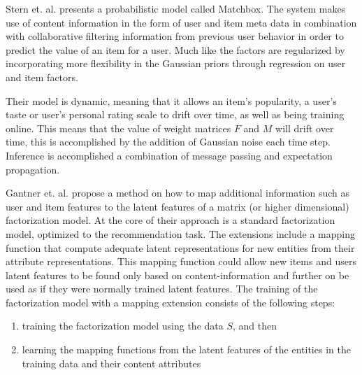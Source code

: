 
Stern et. al. \cite{Stern2009} presents a probabilistic model called Matchbox. The system makes use of content information in the form of user and
item meta data in combination with collaborative filtering information from previous user behavior in order to predict the value of an item for a user. Much like \cite{Agarwal2009} the factors are regularized by incorporating more flexibility in the Gaussian priors through regression on user and item factors.

Their model is dynamic, meaning that it allows an item's popularity, a user's taste or user's personal rating scale to drift over time, as well as being training online. This means that the value of weight matrices $F$ and $M$ will drift over time, this is accomplished by the addition of Gaussian noise each time step. Inference is accomplished a combination of message passing and expectation propagation.


Gantner et. al. \cite{Ganter2010} propose a method on how to map additional
information such as user and item features to the latent features of a matrix
(or higher dimensional) factorization model. At the core of their approach is a
standard factorization model, optimized to the recommendation task. The
extensions include a mapping function that compute adequate latent
representations for new entities from their attribute representations. This
mapping function could allow new items and users latent features to be found
only based on content-information and further on be used as if they were
normally trained latent features. The training of the factorization model with
a mapping extension consists of the following steps:

\begin{enumerate}
\item training the factorization model using the data $S$, and then
\item learning the mapping functions from the latent features of the entities in the training data and their content attributes
\end{enumerate}

